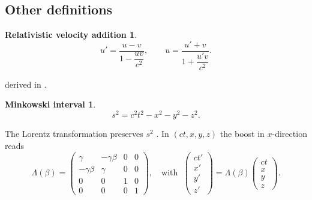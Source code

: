 \documentclass[12pt,
               open=any,
               twoside,
               a4paper,
               titlepage,
               bibliography=totoc,
               xcolor=dvipsnames,
               ]{scrartcl}
\theoremstyle{definition}
\newtheorem*{relveladd}{Relativistic velocity addition}
\theoremstyle{definition}
\newtheorem*{minkinterval}{Minkowski interval}
\begin{document}
			\subsection{Other definitions}
			\label{subsec:otherdefs}
	
				\begin{relveladd}
					\begin{equation}
						u'=\frac{u-v}{1-\dfrac{uv}{c^2}},\qquad
						u=\frac{u'+v}{1+\dfrac{u'v}{c^2}}.
						\label{eq:relveladd}
					\end{equation}
				\end{relveladd}
				
				derived in \textcite[p.~90-91]{Demtroeder1}.
			
				\begin{minkinterval}
					\begin{equation}
						s^2 = c^2 t^2 - x^2 - y^2 - z^2.
						\label{eq:minkowski}
					\end{equation}
				\end{minkinterval}
				The Lorentz transformation preserves $s^2$ \cite{Griffiths}. In $(ct,x,y,z)$ the boost in $x$-direction reads
				\begin{equation}
					\Lambda(\beta)=
					\begin{pmatrix}
						\gamma & -\gamma\beta & 0 & 0\\
						-\gamma\beta & \gamma & 0 & 0\\
						0&0&1&0\\
						0&0&0&1
					\end{pmatrix},
					\quad
					\text{with }\;
					\begin{pmatrix} ct' \\ x' \\ y' \\ z' \end{pmatrix}
					=\Lambda(\beta)\begin{pmatrix} ct \\ x \\ y \\ z \end{pmatrix}.
				\end{equation}
				
	\FloatBarrier
	\clearpage
	
	\printbibliography
	
	\newpage
	
	\appendix
	\setcounter{tocdepth}{1}
	\setcounter{table}{0}
	\setcounter{equation}{0}
	\setcounter{figure}{0}
\end{document}
